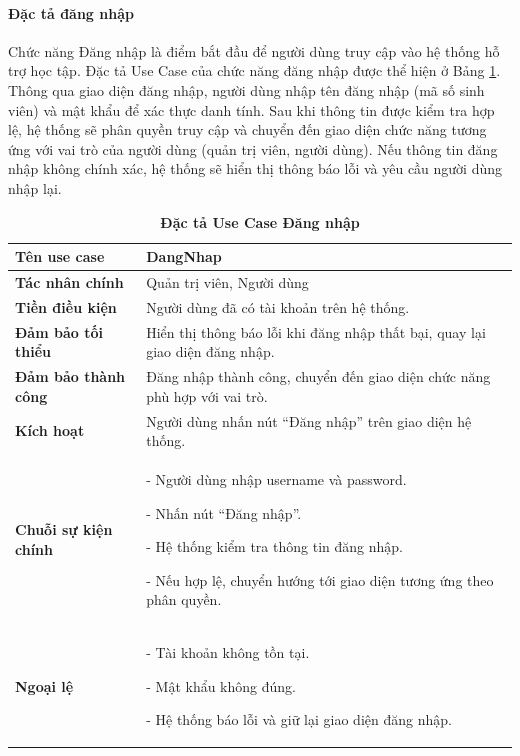 \documentclass{article}
\begin{document}
	\paragraph{Đặc tả đăng nhập} \mbox{}
	
	Chức năng Đăng nhập là điểm bắt đầu để người dùng truy cập vào hệ thống hỗ trợ học tập. Đặc tả Use Case của chức năng đăng nhập được thể hiện ở Bảng \ref{tab31}. Thông qua giao diện đăng nhập, người dùng nhập tên đăng nhập (mã số sinh viên) và mật khẩu để xác thực danh tính. Sau khi thông tin được kiểm tra hợp lệ, hệ thống sẽ phân quyền truy cập và chuyển đến giao diện chức năng tương ứng với vai trò của người dùng (quản trị viên, người dùng). Nếu thông tin đăng nhập không chính xác, hệ thống sẽ hiển thị thông báo lỗi và yêu cầu người dùng nhập lại.
	
	\begin{table}[H]
		\centering
		\caption [Đặc tả Use Case Đăng nhập]{\bfseries \fontsize{12pt}{0pt}\selectfont Đặc tả Use Case Đăng nhập}
		\label{tab31}
		\begin{tabular}{|p{4cm}|p{10cm}|}
			\hline
			\textbf{Tên use case} & DangNhap \\
			\hline
			\textbf{Tác nhân chính} & Quản trị viên, Người dùng \\
			\hline
			\textbf{Tiền điều kiện} & Người dùng đã có tài khoản trên hệ thống. \\
			\hline
			\textbf{Đảm bảo tối thiểu} & Hiển thị thông báo lỗi khi đăng nhập thất bại, quay lại giao diện đăng nhập. \\
			\hline
			\textbf{Đảm bảo thành công} & Đăng nhập thành công, chuyển đến giao diện chức năng phù hợp với vai trò. \\
			\hline
			\textbf{Kích hoạt} & Người dùng nhấn nút “Đăng nhập” trên giao diện hệ thống. \\
			\hline
			\textbf{Chuỗi sự kiện chính} &
			- Người dùng nhập username và password.
			
			- Nhấn nút “Đăng nhập”.
			
			- Hệ thống kiểm tra thông tin đăng nhập.
			
			- Nếu hợp lệ, chuyển hướng tới giao diện tương ứng theo phân quyền.
			\\
			\hline
			\textbf{Ngoại lệ} &
			- Tài khoản không tồn tại.
			
			- Mật khẩu không đúng.
			
			- Hệ thống báo lỗi và giữ lại giao diện đăng nhập.
			\\
			\hline
		\end{tabular}
	\end{table}
\end{document}
